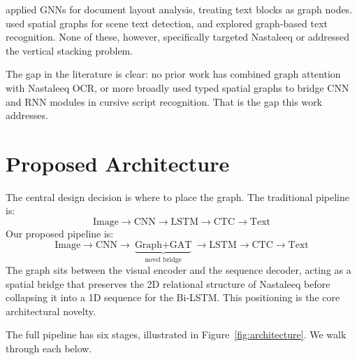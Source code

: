 \documentclass[11pt]{article}
\begin{document}
\citet{liu2021gnn} applied GNNs for document layout analysis, treating text blocks as
graph nodes.
\citet{zhang2020relational} used spatial graphs for scene text detection, and
\citet{qin2021recognizing} explored graph-based text recognition.
None of these, however, specifically targeted Nastaleeq or addressed the vertical
stacking problem.

The gap in the literature is clear: no prior work has combined graph attention with
Nastaleeq OCR, or more broadly used typed spatial graphs to bridge CNN and RNN modules
in cursive script recognition.
That is the gap this work addresses.

\section{Proposed Architecture}

The central design decision is where to place the graph.
The traditional pipeline is:
\[
\text{Image} \to \text{CNN} \to \text{LSTM} \to \text{CTC} \to \text{Text}
\]
Our proposed pipeline is:
{\small
\[
\text{Image} \to \text{CNN} \to 
\underbrace{\text{Graph} + \text{GAT}}_{\text{novel bridge}} \to \text{LSTM} \to \text{CTC} \to \text{Text}
\]
}
The graph sits between the visual encoder and the sequence decoder, acting as a spatial
bridge that preserves the 2D relational structure of Nastaleeq before collapsing it into
a 1D sequence for the Bi-LSTM.
This positioning is the core architectural novelty.

The full pipeline has six stages, illustrated in Figure~\ref{fig:architecture}.
We walk through each below.
\end{document}
